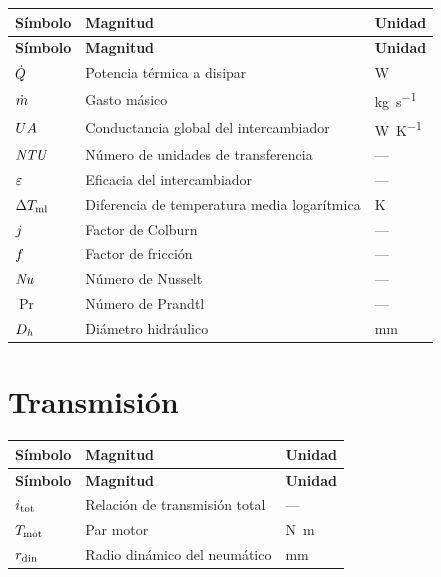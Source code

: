 \begin{longtable}{@{}p{2.2cm}p{8.5cm}p{2.5cm}@{}}
\toprule
\textbf{Símbolo} & \textbf{Magnitud} & \textbf{Unidad} \\
\midrule
\endfirsthead
\toprule
\textbf{Símbolo} & \textbf{Magnitud} & \textbf{Unidad} \\
\midrule
\endhead
$\dot{Q}$  & Potencia térmica a disipar                & \si{\watt} \\
$\dot{m}$  & Gasto másico                              & \si{\kilogram\per\second} \\
$UA$    & Conductancia global del intercambiador    & \si{\watt\per\kelvin} \\
$\mathit{NTU}$   & Número de unidades de transferencia       & --- \\
$\varepsilon$  & Eficacia del intercambiador               & --- \\
$\Delta T_{\mathrm{ml}}$  & Diferencia de temperatura media logarítmica & \si{\kelvin} \\
$j$  & Factor de Colburn                          & --- \\
$f$  & Factor de fricción                         & --- \\
$\mathit{Nu}$   & Número de Nusselt                          & --- \\
$\Pr$    & Número de Prandtl                          & --- \\
$D_h$    & Diámetro hidráulico                        & \si{\milli\meter} \\
\bottomrule
\end{longtable}

\section*{Transmisión}

\begin{longtable}{@{}p{2.2cm}p{8.5cm}p{2.5cm}@{}}
\toprule
\textbf{Símbolo} & \textbf{Magnitud} & \textbf{Unidad} \\
\midrule
\endfirsthead
\toprule
\textbf{Símbolo} & \textbf{Magnitud} & \textbf{Unidad} \\
\midrule
\endhead
$i_{\mathrm{tot}}$  & Relación de transmisión total & --- \\
$T_{\mathrm{mot}}$  & Par motor                     & \si{\newton\meter} \\
$r_{\mathrm{din}}$  & Radio dinámico del neumático  & \si{\milli\meter} \\
\bottomrule
\end{longtable}

